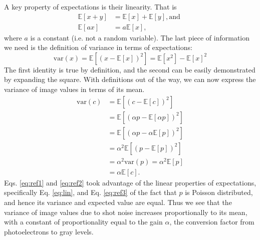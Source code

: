 \documentclass[a4paper]{report}
\begin{document}
A key property of expectations is their linearity. That is
\begin{align}
\mathbb{E}[x+y] &= \mathbb{E}[x] + \mathbb{E}[y], \textrm{and } \\
\mathbb{E}[ax] & = a \mathbb{E}[x], \label{eq:lin}
\end{align}
where $a$ is a constant (i.e. not a random variable). The last piece of information we need is the definition of variance in terms of expectations:
\begin{equation}
	\mathrm{var}(x) = \mathbb{E}[(x - \mathbb{E}[x])^2] = \mathbb{E}[x^2] - \mathbb{E}[x]^2
\end{equation}
The first identity is true by definition, and the second can be easily demonstrated by expanding the square. With definitions out of the way, we can now express the variance of image values in terms of its mean.
\begin{align}
	\mathrm{var}(c) & = \mathbb{E}[(c - \mathbb{E}[c])^2] \\
	& = \mathbb{E}[(\alpha p - \mathbb{E}[\alpha p])^2] \\ 
	& = \mathbb{E}[(\alpha p - \alpha \mathbb{E}[p] )^2] \label{eq:ref1} \\ 
	& = \alpha^2 \mathbb{E}[(p - \mathbb{E}[p])^2] \label{eq:ref2} \\ 
	& = \alpha^2 \mathrm{var}(p) = \alpha^2 \mathbb{E}[p] \label{eq:ref3} \\
	& = \alpha\mathbb{E}[c].
\end{align}
Eqs. \ref{eq:ref1} and \ref{eq:ref2} took advantage of the linear properties of expectations, specifically Eq. \ref{eq:lin}, and Eq. \ref{eq:ref3} of the fact that $p$ is Poisson distributed, and hence its variance and expected value are equal. Thus we see that the variance of image values due to shot noise increases proportionally to its mean, with a constant of proportionality equal to the gain $\alpha$, the conversion factor from photoelectrons to gray levels.
\end{document}
